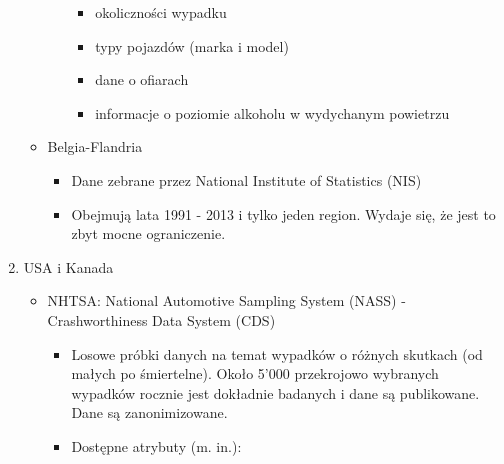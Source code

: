 \begin{enumerate}
\begin{itemize}
\begin{itemize}
      \begin{itemize}
      \itemsep-14pt\parskip0pt
      \item
        okoliczności wypadku\\
      \item
        typy pojazdów (marka i model)\\
      \item
        dane o ofiarach\\
      \item
        informacje o poziomie alkoholu w wydychanym powietrzu\\
      \end{itemize}
    \end{itemize}
  \item
    Belgia-Flandria \cite{belgia}

    \begin{itemize}
    \itemsep-14pt\parskip0pt
    \item
      Dane zebrane przez National Institute of Statistics (NIS)\\
    \item
      Obejmują lata 1991 - 2013 i tylko jeden region. Wydaje się, że
      jest to zbyt mocne ograniczenie.
    \end{itemize}
  \end{itemize}
\item
  USA i Kanada

  \begin{itemize}
  \item
    NHTSA: National Automotive Sampling System (NASS) - Crashworthiness Data System (CDS) \cite{nass}

    \begin{itemize}
    \item
      Losowe próbki danych na temat wypadków o różnych skutkach (od
      małych po śmiertelne). Około 5'000 przekrojowo wybranych wypadków
      rocznie jest dokładnie badanych i dane są publikowane. Dane są
      zanonimizowane.\\
    \item
      Dostępne atrybuty (m. in.):


\end{itemize}
\end{itemize}
\end{enumerate}
